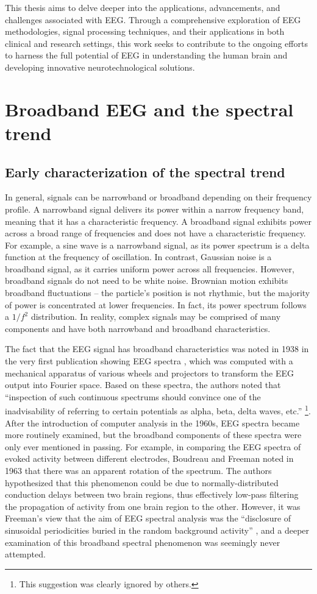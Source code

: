 This thesis aims to delve deeper into the applications, advancements, and challenges associated with EEG. Through a comprehensive exploration of EEG methodologies, signal processing techniques, and their applications in both clinical and research settings, this work seeks to contribute to the ongoing efforts to harness the full potential of EEG in understanding the human brain and developing innovative neurotechnological solutions.

\section{Broadband EEG and the spectral trend} \label{sec:phenomenon}
\subsection{Early characterization of the spectral trend}
In general, signals can be narrowband or broadband depending on their frequency profile. A narrowband signal delivers its power within a narrow frequency band, meaning that it has a characteristic frequency. A broadband signal exhibits power across a broad range of frequencies and does not have a characteristic frequency. For example, a sine wave is a narrowband signal, as its power spectrum is a delta function at the frequency of oscillation. In contrast, Gaussian noise is a broadband signal, as it carries uniform power across all frequencies. However, broadband signals do not need to be white noise. Brownian motion exhibits broadband fluctuations -- the particle's position is not rhythmic, but the majority of power is concentrated at lower frequencies. In fact, its power spectrum follows a $1/f^2$ distribution. In reality, complex signals may be comprised of many components and have both narrowband and broadband characteristics.

The fact that the EEG signal has broadband characteristics was noted in 1938 in the very first publication showing EEG spectra \cite{Grass1938}, which was computed with a mechanical apparatus of various wheels and projectors to transform the EEG output into Fourier space. Based on these spectra, the authors noted that ``inspection of such continuous spectrums should convince one of the inadvisability of referring to certain potentials as alpha, beta, delta waves, etc.'' \footnote[2]{This suggestion was clearly ignored by others.}. After the introduction of computer analysis in the 1960s, EEG spectra became more routinely examined, but the broadband components of these spectra were only ever mentioned in passing. For example, in comparing the EEG spectra of evoked activity between different electrodes, Boudreau and Freeman \cite{Boudreau1963} noted in 1963 that there was an apparent rotation of the spectrum. The authors hypothesized that this phenomenon could be due to normally-distributed conduction delays between two brain regions, thus effectively low-pass filtering the propagation of activity from one brain region to the other. However, it was Freeman’s view that the aim of EEG spectral analysis was the ``disclosure of sinusoidal periodicities buried in the random background activity'' \cite{Freeman1975}, and a deeper examination of this broadband spectral phenomenon was seemingly never attempted. 

